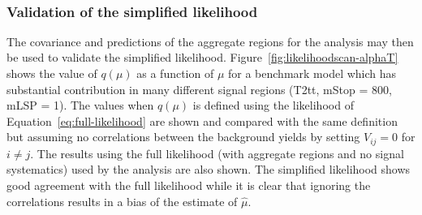 \begin{figure}[!tbhp]
\begin{center}
     ~~
     \\
  \end{center}
\end{figure}

\subsubsection{Validation of the simplified likelihood}

The covariance and predictions of the aggregate regions for the \alphat analysis may then 
be used to validate the simplified likelihood. Figure~\ref{fig:likelihoodscan-alphaT} 
shows the value of $q(\mu)$ as a function of $\mu$ for 
a benchmark model which has substantial contribution in many different signal regions 
(T2tt, mStop = 800, mLSP = 1). The values when $q(\mu)$ is defined using the likelihood of Equation~\ref{eq:full-likelihood} 
are shown and compared with the same definition but assuming no correlations between the 
background yields by setting $V_{ij}=0$ for $i\neq j$. The results using the full likelihood (with aggregate regions and no signal systematics) 
used by the \alphat analysis are also shown. The simplified likelihood shows good agreement with the full likelihood 
while it is clear that ignoring the correlations results in a bias of the estimate of $\hat{\mu}$. 

